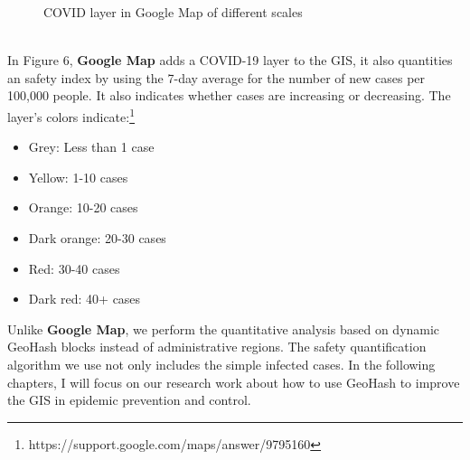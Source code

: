 \documentclass[sigplan,screen]{acmart}
\begin{document}
\begin{figure}[htb]
	\centering
	\caption{COVID layer in Google Map of different scales}
\end{figure}
\\
In Figure 6, \textbf{Google Map} adds a COVID-19 layer to the GIS, it also quantities an safety index by using the 7-day average for the number of new cases per 100,000 people.
It also indicates whether cases are increasing or decreasing.
The layer’s colors indicate:\footnote{https://support.google.com/maps/answer/9795160}
\begin{itemize}
    \item Grey: Less than 1 case
    \item Yellow: 1-10 cases
    \item Orange: 10-20 cases
    \item Dark orange: 20-30 cases
    \item Red: 30-40 cases
    \item Dark red: 40+ cases
\end{itemize}
Unlike \textbf{Google Map}, we perform the quantitative analysis based on dynamic GeoHash blocks instead of administrative regions.
The safety quantification algorithm we use not only includes the simple infected cases.
In the following chapters, I will focus on our research work about how to use GeoHash to improve the GIS in epidemic prevention and control.
\end{document}
